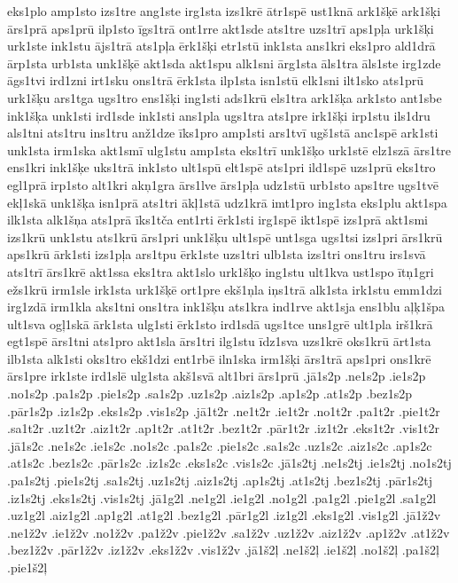 {eks1plo
amp1sto
izs1tre
ang1ste
irg1sta
izs1krē
ātr1spē
ust1knā
ark1šķē
ark1šķi
ārs1prā
aps1prū
ilp1sto
īgs1trā
ont1rre
akt1sde
ats1tre
uzs1trī
aps1pļa
urk1šķi
urk1ste
ink1stu
ājs1trā
ats1pļa
ērk1šķi
etr1stū
ink1sta
ans1kri
eks1pro
ald1drā
ārp1sta
urb1sta
unk1šķē
akt1sda
akt1spu
alk1sni
ārg1sta
āls1tra
āls1ste
irg1zde
āgs1tvi
ird1zni
irt1sku
ons1trā
ērk1sta
ilp1sta
isn1stū
elk1sni
ilt1sko
ats1prū
urk1šķu
ars1tga
ugs1tro
ens1šķi
ing1sti
ads1krū
els1tra
ark1šķa
ark1sto
ant1sbe
ink1šķa
unk1sti
ird1sde
ink1sti
ans1pla
ugs1tra
ats1pre
irk1šķi
irp1stu
ils1dru
als1tni
ats1tru
ins1tru
anž1dze
īks1pro
amp1sti
ars1tvī
ugš1stā
anc1spē
ark1sti
unk1sta
irm1ska
akt1smī
ulg1stu
amp1sta
eks1trī
unk1šķo
urk1stē
elz1szā
ārs1tre
ens1kri
ink1šķe
uks1trā
ink1sto
ult1spū
elt1spē
ats1pri
ild1spē
uzs1prū
eks1tro
egl1prā
irp1sto
alt1kri
akņ1gra
ārs1lve
ārs1pļa
udz1stū
urb1sto
aps1tre
ugs1tvē
ekļ1skā
unk1šķa
isn1prā
ats1tri
ākļ1stā
udz1krā
imt1pro
ing1sta
eks1plu
akt1spa
ilk1sta
alk1šņa
ats1prā
īks1tča
ent1rti
ērk1sti
irg1spē
ikt1spē
izs1prā
akt1smi
izs1krū
unk1stu
ats1krū
ārs1pri
unk1šķu
ult1spē
unt1sga
ugs1tsi
izs1pri
ārs1krū
aps1krū
ārk1sti
izs1pļa
ars1tpu
ērk1ste
uzs1tri
ulb1sta
izs1tri
ons1tru
irs1svā
ats1trī
ārs1krē
akt1ssa
eks1tra
akt1slo
urk1šķo
ing1stu
ult1kva
ust1spo
ītņ1gri
ežs1krū
irm1sle
irk1sta
urk1šķē
ort1pre
ekš1ņla
iņs1trā
alk1sta
irk1stu
emm1dzi
irg1zdā
irm1kla
aks1tni
ons1tra
ink1šķu
ats1kra
ind1rve
akt1sja
ens1blu
aļķ1špa
ult1sva
ogļ1skā
ārk1sta
ulg1sti
ērk1sto
ird1sdā
ugs1tce
uns1grē
ult1pla
irš1krā
egt1spē
ārs1tni
ats1pro
akt1sla
ārs1tri
ilg1stu
īdz1sva
uzs1krē
oks1krū
ārt1sta
ilb1sta
alk1sti
oks1tro
ekš1dzi
ent1rbē
iln1ska
irm1šķi
ārs1trā
aps1pri
ons1krē
ārs1pre
irk1ste
ird1slē
ulg1sta
akš1svā
alt1bri
ārs1prū
.jā1s2p
.ne1s2p
.ie1s2p
.no1s2p
.pa1s2p
.pie1s2p
.sa1s2p
.uz1s2p
.aiz1s2p
.ap1s2p
.at1s2p
.bez1s2p
.pār1s2p
.iz1s2p
.eks1s2p
.vis1s2p
.jā1t2r
.ne1t2r
.ie1t2r
.no1t2r
.pa1t2r
.pie1t2r
.sa1t2r
.uz1t2r
.aiz1t2r
.ap1t2r
.at1t2r
.bez1t2r
.pār1t2r
.iz1t2r
.eks1t2r
.vis1t2r
.jā1s2c
.ne1s2c
.ie1s2c
.no1s2c
.pa1s2c
.pie1s2c
.sa1s2c
.uz1s2c
.aiz1s2c
.ap1s2c
.at1s2c
.bez1s2c
.pār1s2c
.iz1s2c
.eks1s2c
.vis1s2c
.jā1s2tj
.ne1s2tj
.ie1s2tj
.no1s2tj
.pa1s2tj
.pie1s2tj
.sa1s2tj
.uz1s2tj
.aiz1s2tj
.ap1s2tj
.at1s2tj
.bez1s2tj
.pār1s2tj
.iz1s2tj
.eks1s2tj
.vis1s2tj
.jā1g2l
.ne1g2l
.ie1g2l
.no1g2l
.pa1g2l
.pie1g2l
.sa1g2l
.uz1g2l
.aiz1g2l
.ap1g2l
.at1g2l
.bez1g2l
.pār1g2l
.iz1g2l
.eks1g2l
.vis1g2l
.jā1ž2v
.ne1ž2v
.ie1ž2v
.no1ž2v
.pa1ž2v
.pie1ž2v
.sa1ž2v
.uz1ž2v
.aiz1ž2v
.ap1ž2v
.at1ž2v
.bez1ž2v
.pār1ž2v
.iz1ž2v
.eks1ž2v
.vis1ž2v
.jā1š2ļ
.ne1š2ļ
.ie1š2ļ
.no1š2ļ
.pa1š2ļ
.pie1š2ļ
}
